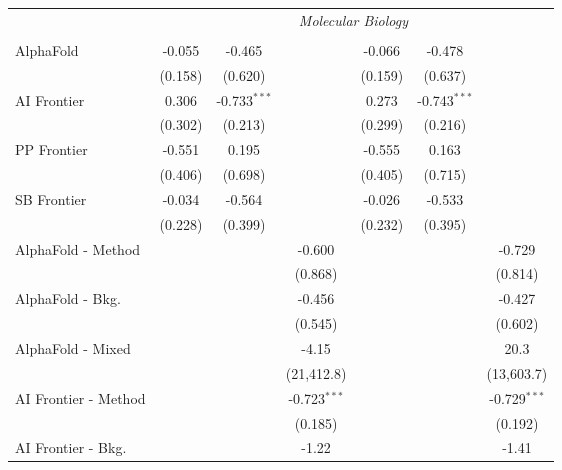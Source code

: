 \begin{tabular}{lcccccc}
 & \multicolumn{6}{c}{\textit{Molecular Biology}} \\ \\
   AlphaFold            & -0.055  & -0.465         &                & -0.066  & -0.478         &   \\   
                        & (0.158) & (0.620)        &                & (0.159) & (0.637)        &   \\   
   AI Frontier          & 0.306   & -0.733$^{***}$ &                & 0.273   & -0.743$^{***}$ &   \\   
                        & (0.302) & (0.213)        &                & (0.299) & (0.216)        &   \\   
   PP Frontier          & -0.551  & 0.195          &                & -0.555  & 0.163          &   \\   
                        & (0.406) & (0.698)        &                & (0.405) & (0.715)        &   \\   
   SB Frontier          & -0.034  & -0.564         &                & -0.026  & -0.533         &   \\   
                        & (0.228) & (0.399)        &                & (0.232) & (0.395)        &   \\   
   AlphaFold - Method   &         &                & -0.600         &         &                & -0.729\\   
                        &         &                & (0.868)        &         &                & (0.814)\\   
   AlphaFold - Bkg.     &         &                & -0.456         &         &                & -0.427\\   
                        &         &                & (0.545)        &         &                & (0.602)\\   
   AlphaFold - Mixed    &         &                & -4.15          &         &                & 20.3\\   
                        &         &                & (21,412.8)     &         &                & (13,603.7)\\   
   AI Frontier - Method &         &                & -0.723$^{***}$ &         &                & -0.729$^{***}$\\   
                        &         &                & (0.185)        &         &                & (0.192)\\   
   AI Frontier - Bkg.   &         &                & -1.22          &         &                & -1.41\\   

\end{tabular}
